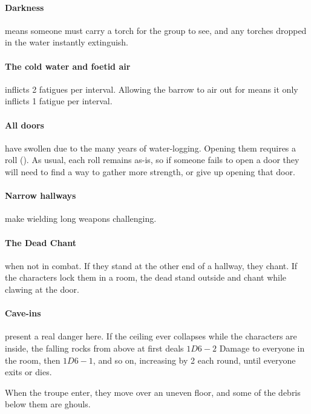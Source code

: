 \paragraph{Darkness}
means someone must carry a torch for the group to see, and any torches dropped in the water instantly extinguish.

\paragraph{The cold water and foetid air}
inflicts 2 \glspl{fatigue} per \gls{interval}.
Allowing the barrow to air out for  means it only inflicts 1 \gls{fatigue} per \gls{interval}.

\paragraph{All doors}
have swollen due to the many years of water-logging.
Opening them requires a  roll (\tn[7]).
As usual, each roll remains as-is, so if someone fails to open a door they will need to find a way to gather more strength, or give up opening that door.

\paragraph{Narrow hallways}
make wielding long weapons challenging.%

\paragraph{The Dead Chant} when not in combat.
If they stand at the other end of a hallway, they chant.
If the characters lock them in a room, the dead stand outside and chant while clawing at the door.

\paragraph{Cave-ins} present a real danger here.  If the ceiling ever collapses while the characters are inside, the falling rocks from above at first deals $1D6-2$ Damage to everyone in the room, then $1D6-1$, and so on, increasing by 2 each round, until everyone exits or dies.


When the troupe enter, they move over an uneven floor, and some of the debris below them are ghouls.

